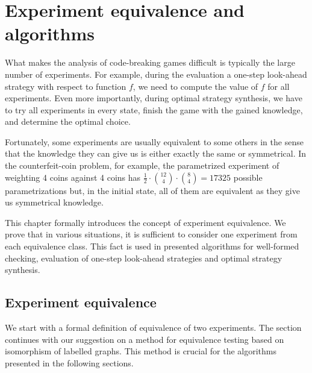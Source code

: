 \chapter{Experiment equivalence and algorithms} \label{ch:expeq}

What makes the analysis of code-breaking games difficult is
  typically the large number of experiments.
For example, during the evaluation a one-step look-ahead strategy with respect to function $f$,
  we need to compute the value of $f$ for all experiments.
Even more importantly,
  during optimal strategy synthesis,
  we have to try all experiments in every state,
  finish the game with the gained knowledge,
  and determine the optimal choice.

Fortunately, some experiments are usually equivalent to some others in the sense
  that the knowledge they can give us is either exactly the same or symmetrical.
In the counterfeit-coin problem, for example,
  the parametrized experiment of weighting 4 coins against 4 coins
  has $\frac{1}{2}\cdot {12 \choose 4}\cdot{8 \choose 4} = 17325$
  possible parametrizations but,
  in the initial state,
  all of them are equivalent
  as they give us symmetrical knowledge.


This chapter formally introduces the concept of experiment equivalence.
We prove that in various situations, it is sufficient to consider
  one experiment from each equivalence class.
This fact is used in presented algorithms for well-formed checking,
  evaluation of one-step look-ahead strategies and
  optimal strategy synthesis.

\section{Experiment equivalence}

We start with a formal definition of equivalence of two experiments.
The section continues with our suggestion on a method for equivalence testing
  based on isomorphism of labelled graphs.
This method is crucial for the algorithms presented in the following sections.

